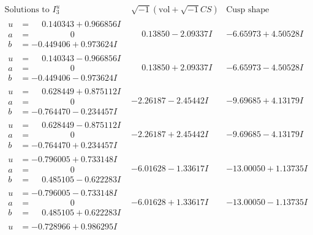 \documentclass[1p]{elsarticle_modified}
\theoremstyle{definition}
\newcommand{\I}{\sqrt{-1}}
\begin{document}
$$\begin{array}{c|c|c}  
\text{Solutions to }I^u_{3}& \I (\text{vol} + \sqrt{-1}CS) & \text{Cusp shape}\\
 \hline 
\begin{aligned}
u &= \phantom{-}0.140343 + 0.966856 I \\
a &= \phantom{-0.000000 } 0 \\
b &= -0.449406 + 0.973624 I\end{aligned}
 & \phantom{-}0.13850 - 2.09337 I & -6.65973 + 4.50528 I \\ \hline\begin{aligned}
u &= \phantom{-}0.140343 - 0.966856 I \\
a &= \phantom{-0.000000 } 0 \\
b &= -0.449406 - 0.973624 I\end{aligned}
 & \phantom{-}0.13850 + 2.09337 I & -6.65973 - 4.50528 I \\ \hline\begin{aligned}
u &= \phantom{-}0.628449 + 0.875112 I \\
a &= \phantom{-0.000000 } 0 \\
b &= -0.764470 - 0.234457 I\end{aligned}
 & -2.26187 - 2.45442 I & -9.69685 + 4.13179 I \\ \hline\begin{aligned}
u &= \phantom{-}0.628449 - 0.875112 I \\
a &= \phantom{-0.000000 } 0 \\
b &= -0.764470 + 0.234457 I\end{aligned}
 & -2.26187 + 2.45442 I & -9.69685 - 4.13179 I \\ \hline\begin{aligned}
u &= -0.796005 + 0.733148 I \\
a &= \phantom{-0.000000 } 0 \\
b &= \phantom{-}0.485105 - 0.622283 I\end{aligned}
 & -6.01628 - 1.33617 I & -13.00050 + 1.13735 I \\ \hline\begin{aligned}
u &= -0.796005 - 0.733148 I \\
a &= \phantom{-0.000000 } 0 \\
b &= \phantom{-}0.485105 + 0.622283 I\end{aligned}
 & -6.01628 + 1.33617 I & -13.00050 - 1.13735 I \\ \hline\begin{aligned}
u &= -0.728966 + 0.986295 I \\

\end{aligned}
\end{array}$$
\end{document}
